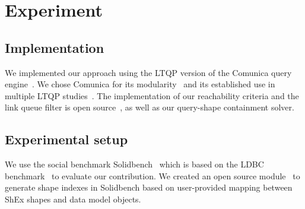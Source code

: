 \section{Experiment}




\subsection{Implementation}
We implemented our approach using the LTQP version of the Comunica query engine~\cite{taelman_iswc_resources_comunica_2018}. 
We chose Comunica for its modularity~\cite{taelman_swj_componentsjs_2022} and its established use in multiple LTQP studies~\cite{Bogaerts2021LinkTW, Taelman2023, eschauzier_quweda_linkqueue_2023, Hanski2024, eschauzier_amw_rcubemetric_2024, tam2024opportunitiesshapebasedoptimizationlink}.
The implementation of our reachability criteria and the link queue filter is open source~, as well as our query-shape containment solver.~

\subsection{Experimental setup}
We use the social benchmark Solidbench~\cite{Taelman2023} which is based on the LDBC benchmark~\cite{Angles2020} to evaluate our contribution.
We created an open source module~ to generate shape indexes in Solidbench based on user-provided mapping between ShEx shapes and data model objects.

